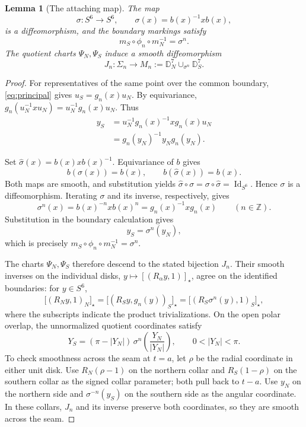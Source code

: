 \documentclass[12pt]{amsart}
\numberwithin{equation}{section}
\newtheorem{lemma}[theorem]{Lemma}
\theoremstyle{remark}
\newcommand{\Id}{\operatorname{Id}}
\begin{document}
\begin{lemma}[The attaching map]\label{lem:topology}
The map
\[
 \sigma:S^6\longrightarrow S^6,\qquad
 \sigma(x)=b(x)^{-1}xb(x),
\]
is a diffeomorphism, and the boundary markings satisfy
\[
 m_S\circ\phi_n\circ m_N^{-1}=\sigma^n.
\]
The quotient charts \(\Psi_N,\Psi_S\) induce a smooth diffeomorphism
\[
 J_n:\Sigma_n\longrightarrow
 M_n:=\mathbb D_N^7\cup_{\sigma^n}\mathbb D_S^7.
\]
\end{lemma}
\begin{proof}
For representatives of the same point over the common boundary,
\eqref{eq:principal} gives \(u_S=g_n(x)u_N\). By equivariance,
\(g_n(u_N^{-1}xu_N)=u_N^{-1}g_n(x)u_N\). Thus
\[
\begin{aligned}
 y_S
 &=u_N^{-1}g_n(x)^{-1}xg_n(x)u_N\\
 &=g_n(y_N)^{-1}y_Ng_n(y_N).
\end{aligned}
\]

Set \(\widehat\sigma(x)=b(x)xb(x)^{-1}\). Equivariance of \(b\)
gives
\[
 b(\sigma(x))=b(x),\qquad b(\widehat\sigma(x))=b(x).
\]
Both maps are smooth, and substitution yields
\(\widehat\sigma\circ\sigma
 =\sigma\circ\widehat\sigma=\Id_{S^6}\).
Hence \(\sigma\) is a diffeomorphism. Iterating \(\sigma\) and its
inverse, respectively, gives
\[
 \sigma^n(x)=b(x)^{-n}xb(x)^n=g_n(x)^{-1}xg_n(x)
 \qquad(n\in\mathbb Z).
\]
Substitution in the boundary calculation gives
\begin{equation}\label{eq:clutching}
 y_S=\sigma^n(y_N),
\end{equation}
which is precisely \(m_S\circ\phi_n\circ m_N^{-1}=\sigma^n\).

The charts \(\Psi_N,\Psi_S\) therefore descend to the stated
bijection \(J_n\). Their smooth inverses on the individual disks,
\(y\mapsto[(R_\alpha y,1)]_\star\), agree on the identified
boundaries: for \(y\in S^6\),
\[
 \bigl[(R_Ny,1)_N\bigr]_\star
 =\bigl[(R_Sy,g_n(y))_S\bigr]_\star
 =\bigl[(R_S\sigma^n(y),1)_S\bigr]_\star,
\]
where the subscripts indicate the product trivializations.
On the open polar overlap, the unnormalized quotient coordinates
satisfy
\[
 Y_S=(\pi-|Y_N|)\,
        \sigma^n\!\left(\frac{Y_N}{|Y_N|}\right),
 \qquad 0<|Y_N|<\pi.
\]
To check smoothness across the seam at \(t=a\), let \(\rho\) be the
radial coordinate in either unit disk. Use
\(R_N(\rho-1)\) on the northern collar and
\(R_S(1-\rho)\) on the southern collar as the signed collar
parameter; both pull back to \(t-a\). Use \(y_N\) on the northern
side and \(\sigma^{-n}(y_S)\) on the southern side as the angular
coordinate. In these collars, \(J_n\) and its inverse preserve both
coordinates, so they are smooth across the seam.
\end{proof}
\end{document}
